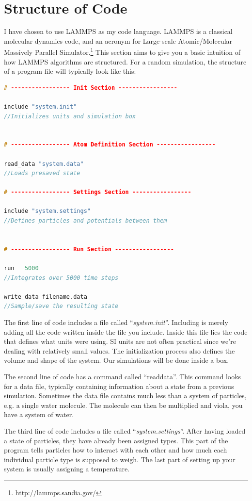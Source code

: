 \documentclass[10pt, a4paper]{report}
\begin{document}
\section*{Structure of Code}
I have chosen to use LAMMPS as my code language.
LAMMPS is a classical molecular dynamics code, and an acronym for Large-scale Atomic/Molecular Massively Parallel Simulator.\footnote{http://lammps.sandia.gov/}
This section aims to give you a basic intuition of how LAMMPS algorithms are structured.
For a random simulation, the structure of a program file will typically look like this: 
\begin{lstlisting}[language=C++]
# ----------------- Init Section -----------------

include "system.init" 
//Initializes units and simulation box


# ----------------- Atom Definition Section -----------------

read_data "system.data"  
//Loads presaved state

# ----------------- Settings Section -----------------

include "system.settings" 
//Defines particles and potentials between them


# ----------------- Run Section -----------------

run   5000 			
//Integrates over 5000 time steps

write_data filename.data	
//Sample/save the resulting state
\end{lstlisting}
The first line of code includes a file called ``\emph{system.init}''. Including is merely adding all the code written inside the file you include.
Inside this file
lies the code that defines what units were using. SI units are not often practical since we're dealing with relatively small values.
The initialization process also defines the volume and shape of the system. Our simulations will be done inside a box.

The second line of code has a command called ``read\textunderscore data''.
This command looks for a data file, typically containing information about a state from a previous simulation.
Sometimes the data file contains much less than a system of particles, e.g. a single water molecule. The molecule can then be multiplied
and viola, you have a system of water.

The third line of code includes a file called ``\emph{system.settings}''.
After having loaded a state of particles, they have already been assigned types.
This part of the program tells particles how to interact with each other and how much each individual particle type is supposed to weigh.
The last part of setting up your system is usually assigning a temperature.
\end{document}
